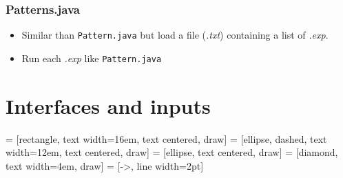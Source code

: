 \documentclass[legalpaper]{article}
\begin{document}
\subsubsection{Patterns.java}
\begin{itemize}
  \item Similar than \texttt{Pattern.java} but load a file (\emph{.txt}) containing a list of \emph{.exp}.
  \item Run each \emph{.exp} like \texttt{Pattern.java}
\end{itemize}

\newpage

\section{Interfaces and inputs}

 = [rectangle, text width=16em, text centered, draw]
 = [ellipse, dashed, text width=12em, text centered, draw]
 = [ellipse, text centered, draw]
 = [diamond, text width=4em, draw]
 = [->, line width=2pt]
\end{document}

